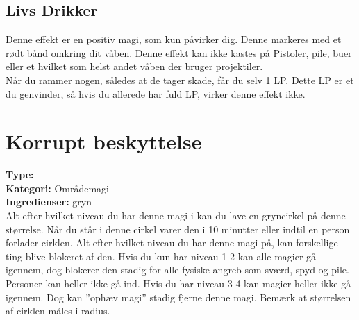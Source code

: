 \subsection{Livs Drikker}
Denne effekt er en positiv magi, som kun påvirker dig. Denne markeres med et rødt bånd omkring dit våben. Denne effekt kan ikke kastes på Pistoler, pile, buer eller et hvilket som helst andet våben der bruger projektiler.\\ 
Når du rammer nogen, således at de tager skade, får du selv 1 LP. Dette LP er et du genvinder, så hvis du allerede har fuld LP, virker denne effekt ikke.\\

\section{Korrupt beskyttelse}
\textbf{Type:} - \\
\textbf{Kategori:} Områdemagi\\
\textbf{Ingredienser:} gryn\\
Alt efter hvilket niveau du har denne magi i kan du lave en gryncirkel på denne størrelse. Når du står i denne cirkel varer den i 10 minutter eller indtil en person forlader cirklen. Alt efter hvilket niveau du har denne magi på, kan forskellige ting blive blokeret af den. Hvis du kun har niveau 1-2 kan alle magier gå igennem, dog blokerer den stadig for alle fysiske angreb som sværd, spyd og pile. Personer kan heller ikke gå ind. Hvis du har niveau 3-4 kan magier heller ikke gå igennem. Dog kan ”ophæv magi” stadig fjerne denne magi. Bemærk at størrelsen af cirklen måles i radius.
